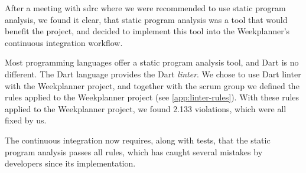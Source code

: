 After a meeting with \gls{sdrc} where we were recommended to use static program analysis, we found it clear, that static program analysis was a tool that would benefit the project, and decided to implement this tool into the Weekplanner's continuous integration workflow.

Most programming languages offer a static program analysis tool, and Dart is no different. The Dart language provides the Dart \textit{linter}\cite{dart_linter_2019}. We chose to use Dart linter with the Weekplanner project, and together with the scrum group we defined the rules applied to the Weekplanner project (see \autoref{app:linter-rules}). With these rules applied to the Weekplanner project, we found 2.133 violations, which were all fixed by us. 

The continuous integration now requires, along with tests, that the static program analysis passes all rules, which has caught several mistakes by developers since its implementation.
